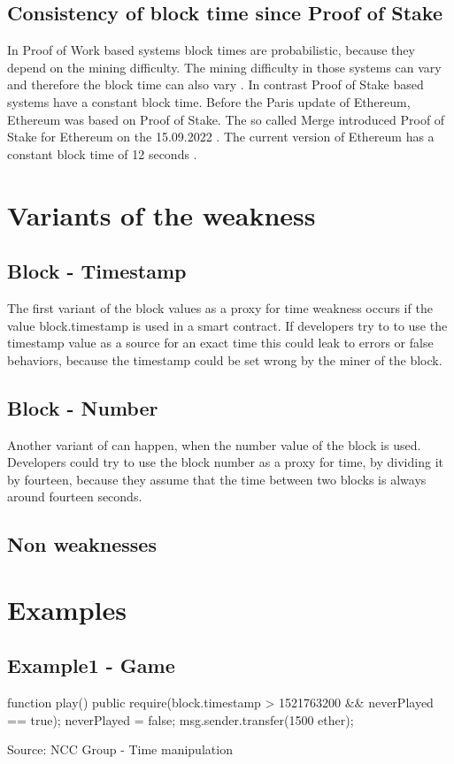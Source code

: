 \documentclass{article}
\begin{document}
\subsection{Consistency of block time since Proof of Stake}
In Proof of Work based systems block times are probabilistic, because they depend on the mining difficulty.
The mining difficulty in those systems can vary and therefore the block time can also vary \cite{eth_blocks}. \newline
In contrast Proof of Stake based systems have a constant block time.
Before the Paris update of Ethereum, Ethereum was based on Proof of Stake. The so called Merge introduced Proof of Stake for Ethereum
on the 15.09.2022 \cite{eth_history}. The current version of Ethereum has a constant block time of 12 seconds \cite{eth_blocks}.

\section{Variants of the weakness}

\subsection{Block - Timestamp}
The first variant of the block values as a proxy for time weakness occurs if the value block.timestamp is used in a smart contract.
If developers try to to use the timestamp value as a source for an exact time this could leak to errors or false behaviors, because 
the timestamp could be set wrong by the miner of the block.

\subsection{Block - Number}
Another variant of can happen, when the number value of the block is used. Developers could try to use the block number as a proxy for time,
by dividing it by fourteen, because they assume that the time between two blocks is always around fourteen seconds.

\subsection{Non weaknesses}

\section{Examples} 
\subsection{Example1 - Game} \label{ex:1}
\begin{solidity} 
    function play() public {
        require(block.timestamp > 1521763200 && neverPlayed == true);
        neverPlayed = false;
        msg.sender.transfer(1500 ether);
    }
\end{solidity}
Source: NCC Group - Time manipulation \cite{DASP2018}
\end{document}
